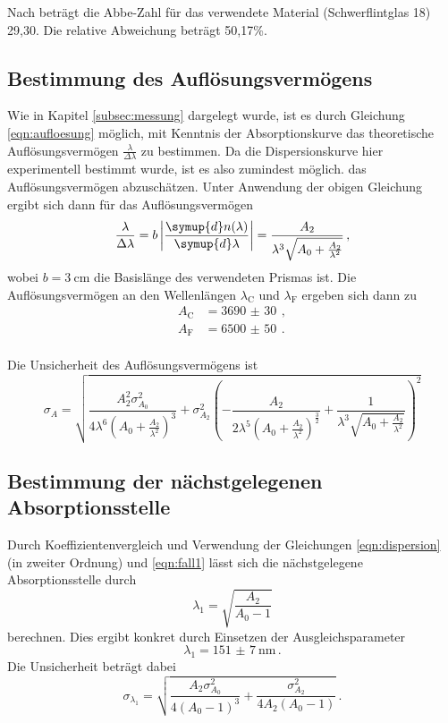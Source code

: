 Nach \cite{flint} beträgt die Abbe-Zahl für das verwendete Material (Schwerflintglas 18)
29{,}30. Die relative Abweichung beträgt 50{,}17\%.

\subsection{Bestimmung des Auflösungsvermögens}
\label{subsec:auflösung}
Wie in Kapitel \ref{subsec:messung} dargelegt wurde, ist es durch Gleichung \eqref{eqn:aufloesung} möglich,
mit Kenntnis der Absorptionskurve das theoretische Auflösungsvermögen $\frac{\lambda}{\Delta \lambda}$ zu bestimmen.
Da die Dispersionskurve hier experimentell bestimmt wurde, ist es also zumindest möglich.
das Auflösungsvermögen abzuschätzen. Unter Anwendung der obigen Gleichung ergibt sich dann
für das Auflösungsvermögen
\begin{equation}
  \frac{\lambda}{\Delta \lambda} = b \left|\frac{\symup{d}n(\lambda)}{\symup{d}\lambda}\right| = \frac{A_2}{\lambda^3\sqrt{A_0 + \frac{A_2}{\lambda^2}}}\,,
\end{equation}
wobei $b = \SI{3}{\centi\meter}$ die Basislänge des verwendeten Prismas ist.
Die Auflösungsvermögen an den Wellenlängen $\lambda_\text{C}$ und $\lambda_\text{F}$
ergeben sich dann zu
\begin{align*}
  A_\text{C} &= \SI{3690(30)}{}\,, \\
  A_\text{F} &= \SI{6500(50)}{}\,. \\
\end{align*}

Die Unsicherheit des Auflösungsvermögens ist
\begin{equation*}
  \sigma_A = \sqrt{\frac{A_2^{2} \sigma_{A_0}^{2}}{4 \lambda^{6} \left(A_0 + \frac{A_2}{\lambda^{2}}\right)^{3}}
  + \sigma_{A_2}^{2} \left(- \frac{A_2}{2 \lambda^{5} \left(A_0 + \frac{A_2}{\lambda^{2}}\right)^{\frac{3}{2}}}
  + \frac{1}{\lambda^{3} \sqrt{A_0 + \frac{A_2}{\lambda^{2}}}}\right)^{2}}
\end{equation*}

\subsection{Bestimmung der nächstgelegenen Absorptionsstelle}
\label{subsec:absorptionsstelle}
Durch Koeffizientenvergleich und Verwendung der Gleichungen \eqref{eqn:dispersion} (in zweiter Ordnung)
und \eqref{eqn:fall1} lässt sich die nächstgelegene Absorptionsstelle durch
\begin{equation*}
  \lambda_1 = \sqrt{\frac{A_2}{A_0-1}}
\end{equation*}
berechnen. Dies ergibt konkret durch Einsetzen der Ausgleichsparameter
\begin{equation*}
  \lambda_1 = \SI{151(7)}{\nano\meter}\,.
\end{equation*}
Die Unsicherheit beträgt dabei
\begin{equation*}
  \sigma_{\lambda_1} = \sqrt{\frac{A_{2} \sigma_{A_{0}}^{2}}{4 \left(A_{0} - 1\right)^{3}} + \frac{\sigma_{A_{2}}^{2}}{4 A_{2} \left(A_{0} - 1\right)}}\,.
\end{equation*}
